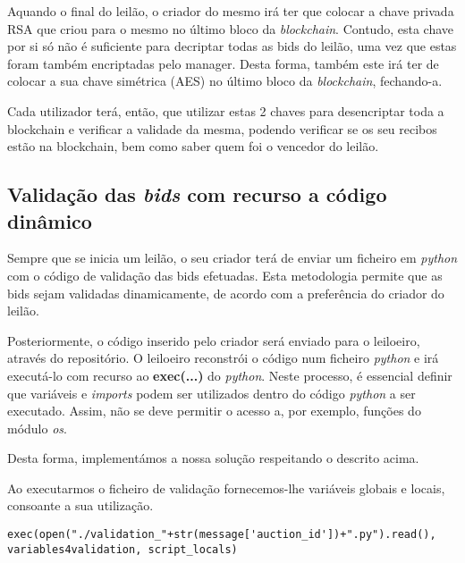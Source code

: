 \documentclass[12pt]{article}
\begin{document}
\par Aquando o final do leilão, o criador do mesmo irá ter que colocar a chave privada RSA que criou para o mesmo no último bloco da \textit{blockchain}. Contudo, esta chave por si só não é suficiente para decriptar todas as bids do leilão, uma vez que estas foram também encriptadas pelo manager. Desta forma, também este irá ter de colocar a sua chave simétrica (AES) no último bloco da \textit{blockchain}, fechando-a.

\par Cada utilizador terá, então, que utilizar estas 2 chaves para desencriptar toda a blockchain e verificar a validade da mesma, podendo verificar se os seu recibos estão na blockchain, bem como saber quem foi o vencedor do leilão.







\subsection{Validação das \textit{bids} com recurso a código dinâmico}

\par Sempre que se inicia um leilão, o seu criador terá de enviar um ficheiro em \textit{python} com o código de validação das bids efetuadas.  Esta metodologia permite que as bids sejam validadas dinamicamente, de acordo com a preferência do criador do leilão.

\par Posteriormente, o código inserido pelo criador será enviado para o leiloeiro, através do repositório. O leiloeiro reconstrói o código num ficheiro \textit{python}  e irá executá-lo com  recurso ao \textbf{exec(...)} do \textit{python}. Neste processo, é essencial definir que variáveis e \textit{imports} podem ser utilizados dentro do código \textit{python} a ser executado. Assim, não se deve permitir o acesso a, por exemplo, funções do módulo \textit{os}.

\par Desta forma, implementámos a nossa solução respeitando o descrito acima.
\par Ao executarmos o ficheiro de validação fornecemos-lhe variáveis globais e locais, consoante a sua utilização.

\vspace{5mm} %

\begin{lstlisting}[caption={Execução de Código Dinâmico},captionpos=b]
exec(open("./validation_"+str(message['auction_id'])+".py").read(), variables4validation, script_locals)
\end{lstlisting}
\end{document}
